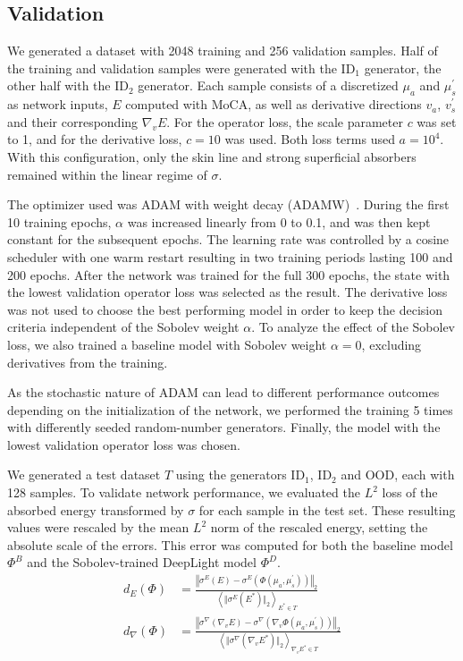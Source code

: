 \documentclass[journal,twoside,web]{ieeecolor}
\begin{document}
\subsection{Validation}
We generated a dataset with 2048 training and 256 validation samples. %
Half of the training and validation samples were generated with the ID$_1$ generator, the other half with the ID$_2$ generator. %
Each sample consists of a discretized $\mu_a$ and $\mu_s^\prime$ as network inputs, $E$ computed with MoCA, as well as derivative directions $v_a$, $v_s^\prime$ and their corresponding $\nabla_v E$. %
For the operator loss, the scale parameter $c$ was set to 1, and for the derivative loss, $c=10$ was used. %
Both loss terms used $a=10^4$. %
With this configuration, only the skin line and strong superficial absorbers remained within the linear regime of $\sigma$.
\par
The optimizer used was ADAM with weight decay (ADAMW)~\cite{Loshchilov2017}. %
During the first 10 training epochs, $\alpha$ was increased linearly from 0 to 0.1, and was then kept constant for the subsequent epochs. %
The learning rate was controlled by a cosine scheduler with one warm restart resulting in two training periods lasting 100 and 200 epochs. %
After the network was trained for the full 300 epochs, the state with the lowest validation operator loss was selected as the result. %
The derivative loss was not used to choose the best performing model in order to keep the decision criteria independent of the Sobolev weight $\alpha$.
To analyze the effect of the Sobolev loss, we also trained a baseline model with Sobolev weight $\alpha=0$, excluding derivatives from the training.
\par
As the stochastic nature of ADAM can lead to different performance outcomes depending on the initialization of the network, we performed the training 5 times with differently seeded random-number generators. %
Finally, the model with the lowest validation operator loss was chosen.
\par
We generated a test dataset $T$ using the generators ID$_1$, ID$_2$ and OOD, each with 128 samples. %
To validate network performance, we evaluated the $L^2$ loss of the absorbed energy transformed by $\sigma$ for each sample in the test set. %
These resulting values were rescaled by the mean $L^2$ norm of the rescaled energy, setting the absolute scale of the errors. %
This error was computed for both the baseline model $\Phi^B$ and the Sobolev-trained DeepLight model $\Phi^D$.
\begin{align}
    d_E(\Phi) &= \frac{\left\Vert \sigma^E(E) - \sigma^E(\Phi(\mu_a, \mu_s^\prime)) \right\Vert_2}{\left\langle \Vert \sigma^E(E^*) \Vert_2\right\rangle_{E^* \in T}}\\
    d_\nabla(\Phi) &= \frac{\left\Vert \sigma^\nabla(\nabla_v E) - \sigma^\nabla(\nabla_v \Phi(\mu_a, \mu_s^\prime)) \right\Vert_2}{\left\langle\Vert \sigma^\nabla(\nabla_v E^*)\Vert_2\right\rangle_{\nabla_v E^* \in T}}
    \label{eq:eval_loss}
\end{align}
\end{document}
